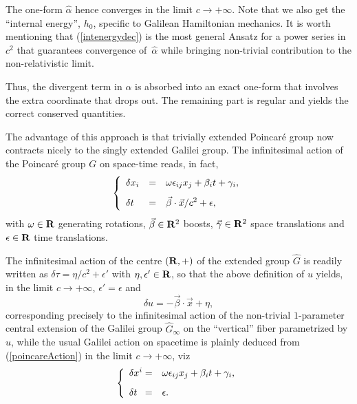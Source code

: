 \documentclass[a4paper,11pt]{article}
\newcommand{\cJ}{{\cal J}}
\newcommand{\bR}{{\bf R}}
\newcommand{\vx}{{\vec x}}
\def\vbeta{{\vec\beta}}
\def\vgamma{{\vec\gamma}}
\def\vx{{\vec x}}
\begin{document}
\goodbreak
The one-form $\widehat{\alpha}$ hence converges in the limit
$c\to+\infty$. Note that we also get the
``internal energy'', $h_0$, specific to Galilean Hamiltonian mechanics.
It is worth mentioning that (\ref{intenergydec}) is the most general
Ansatz for a power series in~$c^2$ that guarantees convergence
of~$\widehat{\alpha}$ while bringing non-trivial contribution to the
non-relativistic limit.

Thus, the divergent term in $\alpha$ is absorbed into
an exact one-form that involves the extra coordinate that drops out.
The remaining part is regular and yields the correct conserved quantities.



The advantage of this approach is that trivially extended
Poincar\'e group now contracts nicely
to the singly extended Galilei group.
The infinitesimal action of the
Poincar\'e group $G$ on space-time reads, in fact,
\begin{equation}
\left\{
\begin{array}{ccc}
\delta x_{i}\hfill&=&\omega{}\epsilon_{ij}x_{j}+\beta_{i}{}t+\gamma_{i},\hfill
\\[8pt]
\delta{t}\hfill&=&\displaystyle\vbeta\cdot\vx/{c^2}+\epsilon,\hfill
\end{array}
\right.
\label{poincareAction}
\end{equation}
with
$\omega\in\bR$ generating rotations,
$\vbeta\in\bR^2$ boosts,
$\vgamma\in\bR^2$ space translations and $\epsilon\in\bR$ time
translations.

\goodbreak

The infinitesimal action of the centre $(\bR,+)$ of the extended group
$\widehat{G}$ is readily written as
$
\delta{\tau}={\eta}/{c^2}+\epsilon'
$
with $\eta,\epsilon'\in\bR$, so that the above definition of $u$ yields, in the
limit $c\to+\infty$,
$\epsilon'=\epsilon$ and
\begin{equation}
\delta{u}=-\vbeta\cdot\vx+\eta,
\label{BargmannAction}
\end{equation}
corresponding precisely to the infinitesimal action of the non-trivial
$1$-parameter central extension of the Galilei group
$\widehat{G}_\infty$ on the ``vertical'' fiber parametrized by $u$, while the
usual Galilei action
on spacetime is plainly deduced from (\ref{poincareAction}) in the limit
$c\to+\infty$, viz
\begin{equation}
\left\{
\begin{array}{cc}
   \delta x^i\hfill=&
\omega{}\epsilon_{ij}x_{j}+\beta_{i}{}t+\gamma_{i},
\hfill\\[8pt]
\delta{t}\hfill=&
\epsilon.
\hfill
\end{array}
\right.
\label{galileiAction}
\end{equation}
\end{document}
